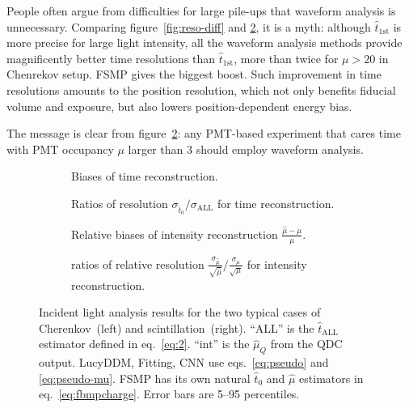 People often argue from difficulties for large pile-ups that waveform analysis is unnecessary.  Comparing figure~\ref{fig:reso-diff} and \ref{fig:deltamethods}, it is a myth: although $\hat{t}_\mathrm{1st}$ is more precise for large light intensity, all the waveform analysis methods provide magnificently better time resolutions than $\hat{t}_\mathrm{1st}$, more than twice for $\mu>20$ in Chenrekov setup.  FSMP gives the biggest boost.  Such improvement in time resolutions amounts to the position resolution, which not only benefits fiducial volume and exposure, but also lowers position-dependent energy bias.

The message is clear from figure~\ref{fig:deltamethods}: any PMT-based experiment that cares time with PMT occupancy $\mu$ larger than 3 should employ waveform analysis.

\begin{figure}[H]
  \begin{subfigure}[b]{\textwidth}
    \centering
    \resizebox{\textwidth}{!}{}
    \caption{\label{fig:biasmethods} Biases of time reconstruction.}
  \end{subfigure}
  \begin{subfigure}[b]{\textwidth}
    \centering
    \resizebox{\textwidth}{!}{}
    \caption{\label{fig:deltamethods} Ratios of resolution $\sigma_{\hat{t}_0}/\sigma_{\mathrm{ALL}}$ for time reconstruction.}
  \end{subfigure}
  \begin{subfigure}[b]{\textwidth}
    \centering
    \resizebox{\textwidth}{!}{}
    \caption{\label{fig:biasmu} Relative biases of intensity reconstruction $\frac{\hat{\mu} - \mu}{\mu}$.}
  \end{subfigure}
  \begin{subfigure}[b]{\textwidth}
    \centering
    \resizebox{\textwidth}{!}{}
    \caption{\label{fig:deltamu} ratios of relative resolution $\frac{\sigma_{\hat{\mu}}}{\sqrt{\hat{\mu}}}/\frac{\sigma_\mu}{\sqrt{\mu}}$ for intensity reconstruction. }
  \end{subfigure}
  \caption{Incident light analysis results for the two typical cases of Cherenkov~(left) and scintillation~(right).  ``ALL'' is the $\hat{t}_\mathrm{ALL}$ estimator defined in eq.~\eqref{eq:2}. ``int'' is the $\hat{\mu}_Q$ from the QDC output.  LucyDDM, Fitting, CNN use eqs.~\eqref{eq:pseudo} and \eqref{eq:pseudo-mu}.  FSMP has its own natural $\hat{t}_0$ and $\hat{\mu}$ estimators in eq.~\eqref{eq:fbmpcharge}. Error bars are 5--95 percentiles.}
\end{figure}

